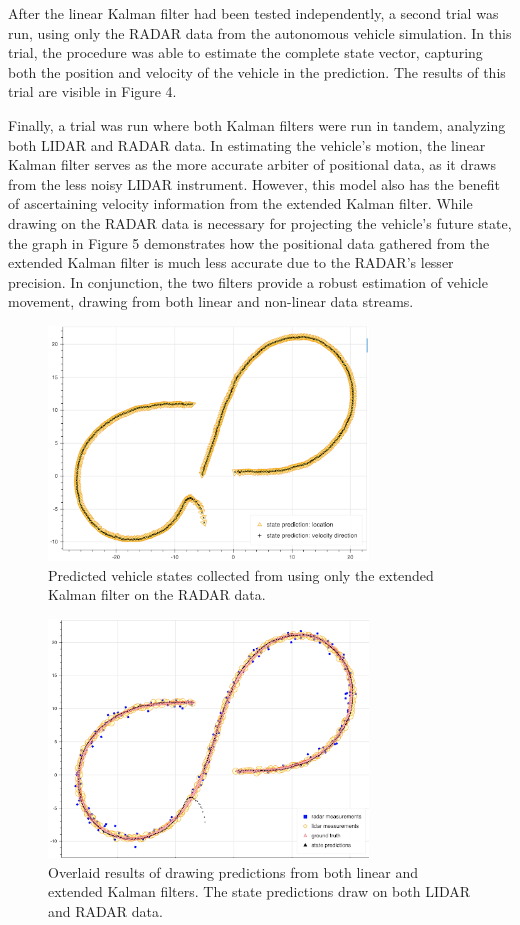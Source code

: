 \documentclass{article}
\begin{document}
After the linear Kalman filter had been tested independently, a second trial was run, using only the RADAR data from the autonomous vehicle simulation. In this trial, the procedure was able to estimate the complete state vector, capturing both the position and velocity of the vehicle in the prediction. The results of this trial are visible in Figure 4.

Finally, a trial was run where both Kalman filters were run in tandem, analyzing both LIDAR and RADAR data. In estimating the vehicle's motion, the linear Kalman filter serves as the more accurate arbiter of positional data, as it draws from the less noisy LIDAR instrument. However, this model also has the benefit of ascertaining velocity information from the extended Kalman filter. While drawing on the RADAR data is necessary for projecting the vehicle's future state, the graph in Figure 5 demonstrates how the positional data gathered from the extended Kalman filter is much less accurate due to the RADAR's lesser precision. In conjunction, the two filters provide a robust estimation of vehicle movement, drawing from both linear and non-linear data streams.

\begin{figure}[hb]
\begin{minipage}[b]{1.0\linewidth}
  \centering
  \centerline{\includegraphics[width=8.5cm]{4.png}}
\end{minipage}
\caption{Predicted vehicle states collected from using only the extended Kalman filter on the RADAR data.}
\end{figure}

\begin{figure}[ht]
\begin{minipage}[b]{1.0\linewidth}
  \centering
  \centerline{\includegraphics[width=8.5cm]{5.png}}
\end{minipage}
\caption{Overlaid results of drawing predictions from both linear and extended Kalman filters. The state predictions draw on both LIDAR and RADAR data.}
\end{figure}
\end{document}
